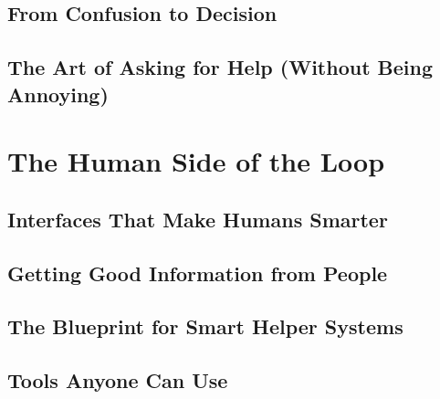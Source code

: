 \documentclass[
11pt,                    %
twoside,                 %
openright,               %
headinclude,             %
footinclude=false,       %
BCOR=12mm,               %
DIV=12,                  %
numbers=noenddot,        %
bibliography=totoc,      %
listof=totoc,            %
]{scrbook}
\begin{document}
	\chapter{From Confusion to Decision}
	\label{ch:decision}
	
	

	\chapter{The Art of Asking for Help (Without Being Annoying)}
	\label{ch:asking}
	
	

	\part{The Human Side of the Loop}

	\chapter{Interfaces That Make Humans Smarter}
	\label{ch:interfaces}
	
	

	\chapter{Getting Good Information from People}
	\label{ch:annotation}
	
	

	\chapter{The Blueprint for Smart Helper Systems}
	\label{ch:blueprint}
	
	

	\chapter{Tools Anyone Can Use}
	\label{ch:tools}
	
	

\end{document}
